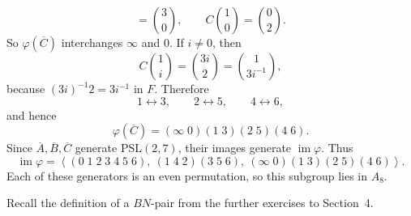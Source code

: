 \documentclass[../Odyssey_Project.tex]{subfiles}
\begin{document}
\begin{solution}
\[    =
    \binom{3}{0},
    \qquad
    C\binom{1}{0}
    =
    \binom{0}{2}.
\]
So $\varphi(\overline C)$ interchanges $\infty$ and $0$. If $i\neq0$, then
\[
    C\binom{1}{i}
    =
    \binom{3i}{2}
    =
    \binom{1}{3i^{-1}},
\]
because $(3i)^{-1}2=3i^{-1}$ in $F$. Therefore
\[
    1\leftrightarrow3,
    \qquad
    2\leftrightarrow5,
    \qquad
    4\leftrightarrow6,
\]
and hence
\[
    \varphi(\overline C)=(\infty\;0)(1\;3)(2\;5)(4\;6).
\]
Since $\overline A,\overline B,\overline C$ generate $\mathrm{PSL}(2,7)$, their images generate $\operatorname{im}\varphi$. Thus
\[
    \operatorname{im}\varphi
    =
    \left\langle
    (0\;1\;2\;3\;4\;5\;6),\
    (1\;4\;2)(3\;5\;6),\
    (\infty\;0)(1\;3)(2\;5)(4\;6)
    \right\rangle .
\]
Each of these generators is an even permutation, so this subgroup lies in $A_8$.
\end{solution}

Recall the definition of a $BN$-pair from the further exercises to Section~4.
\end{document}
